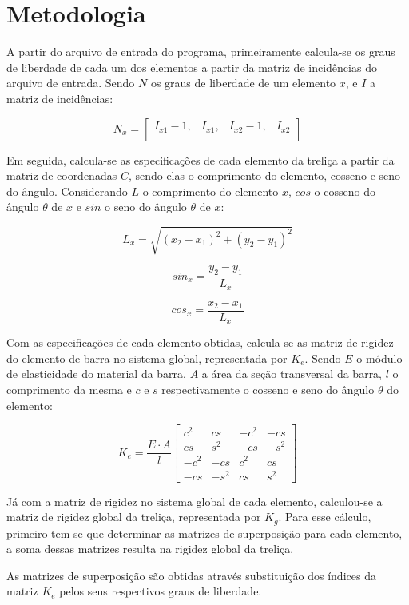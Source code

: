 \documentclass[paper=a4, fontsize=11pt]{scrartcl}
\begin{document}
\section{Metodologia}

A partir do arquivo de entrada do programa, primeiramente calcula-se os graus de liberdade de cada um dos elementos a partir da matriz de incidências do arquivo de entrada. Sendo \(N\) os graus de liberdade de um elemento \(x\), e \(I\) a matriz de incidências:


\[N_x = 
\begin{bmatrix}
I_{x1} - 1 ,& I_{x1} ,& I_{x2} - 1 ,& I_{x2}  \\
\end{bmatrix}
\]

Em seguida, calcula-se as especificações de cada elemento da treliça a partir da matriz de coordenadas \(C\), sendo elas o comprimento do elemento, cosseno e seno do ângulo. Considerando \(L\) o comprimento do elemento \(x\), \(cos\) o cosseno do ângulo \(\theta\) de \(x\) e \(sin\) o seno do ângulo \(\theta\) de \(x\):

\[L_x = \sqrt{(x_2 - x_1)^2 + (y_2 - y_1)^2}\]

\[sin_x = \frac{y_2 - y_1}{L_x}\]

\[cos_x = \frac{x_2 - x_1}{L_x} \]

Com as especificações de cada elemento obtidas, calcula-se as matriz de rigidez do elemento de barra no sistema global, representada por \(K_e\). Sendo \(E\) o módulo de elasticidade do material da barra, \(A\) a área da seção transversal da barra, \(l\) o comprimento da mesma e \(c\) e \(s\) respectivamente o cosseno e seno do ângulo \(\theta\) do elemento:

\[K_e = \frac{E \cdot A}{l}
\begin{bmatrix}
c^2 & cs & -c^2 & -cs\\
cs & s^2 & -cs & -s^2 \\
-c^2 & -cs & c^2 & cs \\
-cs & -s^2 & cs & s^2
\end{bmatrix}
\]

Já com a matriz de rigidez no sistema global de cada elemento, calculou-se a matriz de rigidez global da treliça, representada por \(K_g\). Para esse cálculo, primeiro tem-se que determinar as matrizes de superposição para cada elemento, a soma dessas matrizes resulta na rigidez global da treliça. 
	
As matrizes de superposição são obtidas através substituição dos índices da matriz \(K_e\) pelos seus respectivos graus de liberdade.
\end{document}
